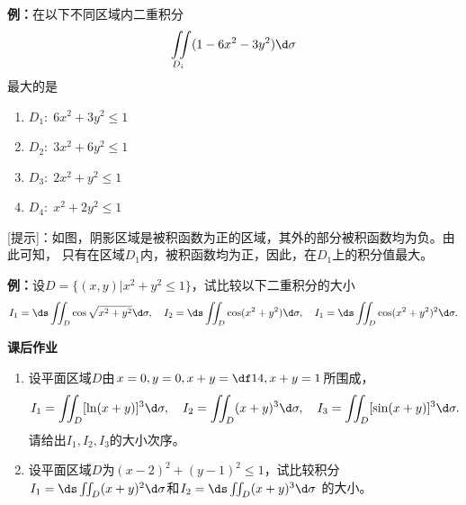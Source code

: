 {\bf 例：}在以下不同区域内二重积分
$$\iint\limits_{D_i}(1-6x^2-3y^2)\d\sigma$$
最大的是
\begin{enumerate}[(1)]
  \setlength{\itemindent}{1cm}
  \item $D_1:\;6x^2+3y^2\leq 1$
  \item $D_2:\;3x^2+6y^2\leq 1$
  \item $D_3:\;2x^2+y^2\leq 1$
  \item $D_4:\;x^2+2y^2\leq 1$
\end{enumerate}

\begin{center}
\end{center}

[提示]：如图，阴影区域是被积函数为正的区域，其外的部分被积函数均为负。由此可知，
只有在区域$D_1$内，被积函数均为正，因此，在$D_1$上的积分值最大。

{\bf 例：}设$D=\{(x,y)|x^2+y^2\leq1\}$，试比较以下二重积分的大小
$$I_1=\ds\iint_D\cos\sqrt{x^2+y^2}\d\sigma,\quad
I_2=\ds\iint_D\cos(x^2+y^2)\d\sigma,\quad
I_1=\ds\iint_D\cos(x^2+y^2)^2\d\sigma.$$

\begin{ext}
	{\bf 课后作业}
	\begin{enumerate}
	  \item 设平面区域$D$由$x=0,y=0,x+y=\df14,x+y=1$所围成，
	  $$I_1=\iint_D[\ln(x+y)]^3\d\sigma,\quad
	  I_2=\iint_D(x+y)^3\d\sigma,\quad
	  I_3=\iint_D[\sin(x+y)]^3\d\sigma.$$
	  请给出$I_1,I_2,I_3$的大小次序。
	  \item 设平面区域$D$为$(x-2)^2+(y-1)^2\leq1$，试比较积分
	  $I_1=\ds\iint_D(x+y)^2\d\sigma$和$I_2=\ds\iint_D(x+y)^3\d\sigma$
	  的大小。
	\end{enumerate}
\end{ext}

